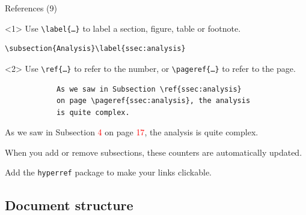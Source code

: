 \documentclass{beamer}
\newcommand{\code}[1]{\texttt{#1}}
\newcommand{\command}[2]{\texttt{\textbackslash#1\{#2\}}}
\newcommand{\red}[1]{\textcolor{red}{#1}}
\begin{document}
\begin{frame}[fragile]{References (9)}

    \begin{onlyenv}<1>
        Use \command{label}{\ldots} to label a section, figure, table or footnote.

        \medskip

        \begin{verbatim}
\subsection{Analysis}\label{ssec:analysis}
        \end{verbatim}
    \end{onlyenv}
    
    \begin{onlyenv}<2>
        Use \command{ref}{\ldots} to refer to the number, or \command{pageref}{\ldots} to refer to the page.
        
        \medskip
    
        \small
        \begin{verbatim}
            As we saw in Subsection \ref{ssec:analysis} 
            on page \pageref{ssec:analysis}, the analysis
            is quite complex.
        \end{verbatim}
        \normalsize
    
        \begin{center}
            As we saw in Subsection \red{4} on page \red{17}, the analysis is quite complex.
        \end{center}
    
        \medskip
    
        When you add or remove subsections, these counters are automatically updated.
    
        \medskip
    
        Add the \code{hyperref} package to make your links clickable.
    \end{onlyenv}

\end{frame}

\subsection{Document structure}
\end{document}

